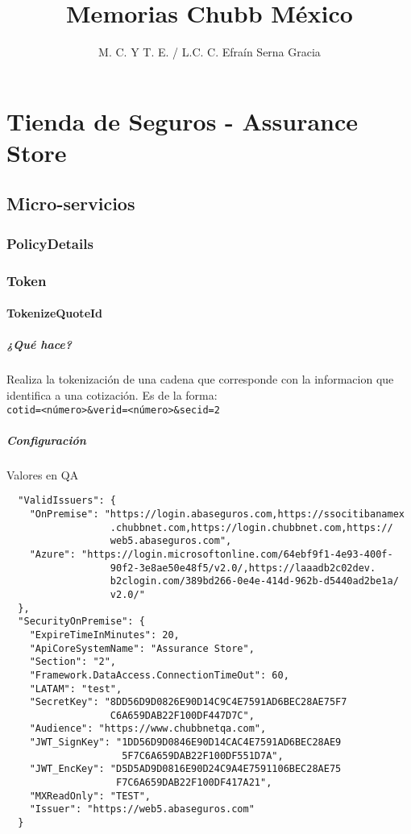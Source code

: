 \documentclass[12pt]{book} %
\title{Memorias Chubb México}
\author{M. C. Y T. E. / L.C. C. Efraín Serna Gracia}
\begin{document}
\maketitle
\tableofcontents

\part{Tienda de Seguros - Assurance Store}

\chapter{Micro-servicios}

\section{PolicyDetails}

\section{Token}

\subsection{TokenizeQuoteId}

\subsubsection{¿Qué hace?}
Realiza la tokenización de una cadena que corresponde con la informacion que identifica a una cotización. Es de la forma:\\ \verb_cotid=<número>&verid=<número>&secid=2_

\subsubsection{Configuración}
Valores en QA
\begin{verbatim}
  "ValidIssuers": {
    "OnPremise": "https://login.abaseguros.com,https://ssocitibanamex
                  .chubbnet.com,https://login.chubbnet.com,https://
                  web5.abaseguros.com",
    "Azure": "https://login.microsoftonline.com/64ebf9f1-4e93-400f-
                  90f2-3e8ae50e48f5/v2.0/,https://laaadb2c02dev.
                  b2clogin.com/389bd266-0e4e-414d-962b-d5440ad2be1a/
                  v2.0/"
  },
  "SecurityOnPremise": {
    "ExpireTimeInMinutes": 20,
    "ApiCoreSystemName": "Assurance Store",
    "Section": "2",
    "Framework.DataAccess.ConnectionTimeOut": 60,
    "LATAM": "test",
    "SecretKey": "8DD56D9D0826E90D14C9C4E7591AD6BEC28AE75F7
                  C6A659DAB22F100DF447D7C",
    "Audience": "https://www.chubbnetqa.com",
    "JWT_SignKey": "1DD56D9D0846E90D14CAC4E7591AD6BEC28AE9
                    5F7C6A659DAB22F100DF551D7A",
    "JWT_EncKey": "D5D5AD9D0816E90D24C9A4E7591106BEC28AE75
                   F7C6A659DAB22F100DF417A21",
    "MXReadOnly": "TEST",
    "Issuer": "https://web5.abaseguros.com"
  }
\end{verbatim}
\end{document}
